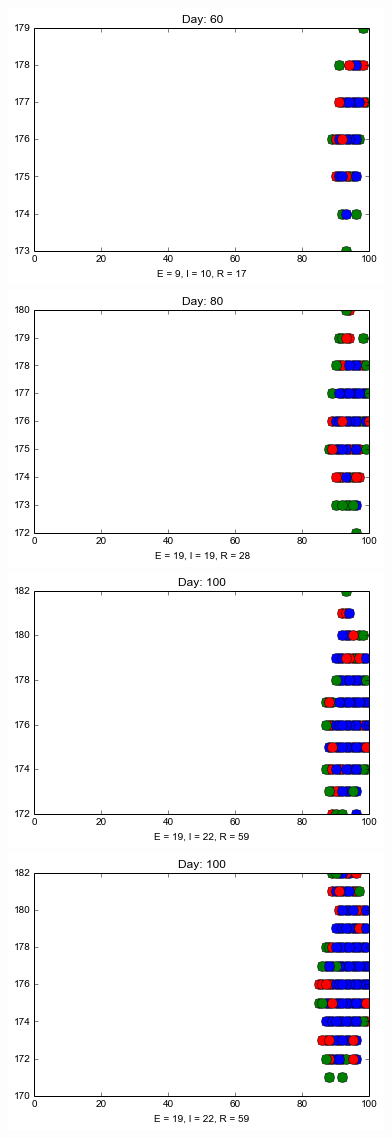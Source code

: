\newpage
\begin{minipage}{\linewidth}

\centering
\includegraphics[scale=0.28]{images/1t60.png} \quad
\includegraphics[scale=0.28]{images/1t80.png} \quad
\includegraphics[scale=0.28]{images/1t100.png} \quad
\includegraphics[scale=0.28]{images/1t120.png} 


\end{minipage}
